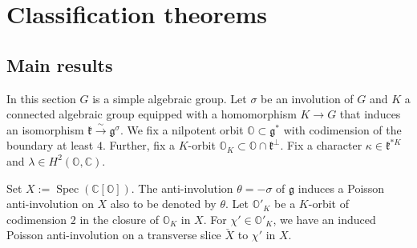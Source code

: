 \documentclass[12pt]{amsart}
\newcommand{\C}{\mathbb{C}}
\newcommand{\g}{\mathfrak{g}}
\newcommand{\Orb}{\mathbb{O}}
\newcommand{\Z}{\mathbb{Z}}
\newcommand{\kf}{\mathfrak{k}}
\theoremstyle{definition}
\numberwithin{equation}{section}
\begin{document}

\section{Classification theorems}\label{S_classif_thm}
\subsection{Main results}\label{SS_main_results}
In this section $G$ is a  simple algebraic group. Let $\sigma$ be an involution of
$G$ and $K$ a connected algebraic group equipped with a homomorphism $K\rightarrow G$ that induces
an isomorphism $\kf\xrightarrow{\sim} \g^\sigma$. We fix a nilpotent orbit $\Orb\subset \g^*$
with codimension of the boundary at least $4$. Further, fix a $K$-orbit $\Orb_K\subset \Orb\cap
\kf^\perp$. Fix a character $\kappa\in \kf^{*K}$ and $\lambda\in H^2(\Orb,\C)$.

Set $X:=\operatorname{Spec}(\C[\Orb])$. The anti-involution $\theta=-\sigma$ of $\g$ induces a
Poisson anti-involution on $X$ also to be denoted by $\theta$.
Let $\Orb'_K$ be a $K$-orbit of codimension $2$ in the
closure of $\Orb_K$ in $X$. For $\chi'\in \Orb'_K$, we have an induced Poisson anti-involution
on a transverse slice $\check{X}$ to $\chi'$ in $X$.

%
\end{document}
